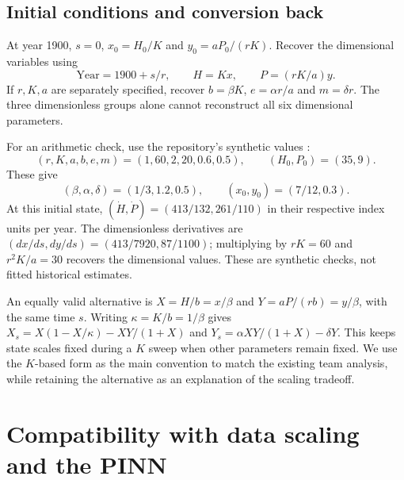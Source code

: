 \subsection{Initial conditions and conversion back}
At year 1900, $s=0$, $x_0=H_0/K$ and $y_0=aP_0/(rK)$. Recover the dimensional
variables using
\begin{equation}
\mathrm{Year}=1900+s/r,\qquad H=Kx,\qquad P=(rK/a)y.
\end{equation}
If $r,K,a$ are separately specified, recover
$b=\beta K$, $e=\alpha r/a$ and $m=\delta r$. The three dimensionless groups alone
cannot reconstruct all six dimensional parameters.

For an arithmetic check, use the repository's synthetic values
\cite{arnav_teamrepo2026}:
\[
(r,K,a,b,e,m)=(1,60,2,20,0.6,0.5),\qquad (H_0,P_0)=(35,9).
\]
These give
\begin{equation}
(\beta,\alpha,\delta)=(1/3,1.2,0.5),\qquad (x_0,y_0)=(7/12,0.3).
\end{equation}
At this initial state, $(\dot H,\dot P)=(413/132,261/110)$ in their respective
index units per year. The dimensionless derivatives are
$(dx/ds,dy/ds)=(413/7920,87/1100)$; multiplying by $rK=60$ and
$r^2K/a=30$ recovers the dimensional values. These are synthetic checks, not fitted
historical estimates.

An equally valid alternative is $X=H/b=x/\beta$ and $Y=aP/(rb)=y/\beta$,
with the same time $s$. Writing $\kappa=K/b=1/\beta$ gives
$X_s=X(1-X/\kappa)-XY/(1+X)$ and
$Y_s=\alpha XY/(1+X)-\delta Y$. This keeps state scales fixed during a $K$
sweep when other parameters remain fixed. We use the $K$-based form as the main
convention to match the existing team analysis, while retaining the alternative
as an explanation of the scaling tradeoff.

\section{Compatibility with data scaling and the PINN}
